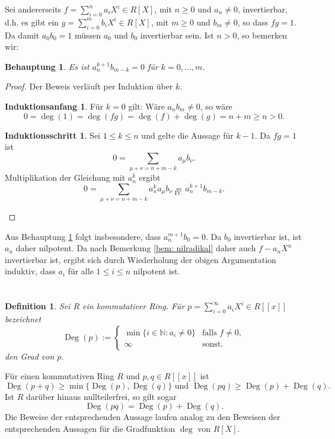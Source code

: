 \documentclass[a4paper,10pt]{article}
\newcounter{satze}
\newtheorem{beh}[satze]{Behauptung}
\newtheorem*{defi}{Definition}
\theoremstyle{definition}
\newtheorem*{ia}{Induktionsanfang}
\newtheorem*{is}{Induktionsschritt}
\newcommand{\N}{\mathbb{N}}
\newcommand{\Deg}{\operatorname{Deg}}
\begin{document}
Sei andererseits $f = \sum_{i=0}^n a_i X^i \in R[X]$, mit $n \geq 0$ und $a_n \neq 0$, invertierbar, d.h. es gibt ein $g = \sum_{i=0}^m b_i X^i \in R[X]$, mit $m \geq 0$ und $b_m \neq 0$, so dass $fg = 1$. Da damit $a_0 b_0 = 1$ müssen $a_0$ und $b_0$ invertierbar sein. Ist $n > 0$, so bemerken wir:

\begin{beh}\label{beh: a_n nilpotent}
 Es ist $a_n^{k+1} b_{m-k} = 0$ für $k=0,\ldots,m$.
\end{beh}
\begin{proof}
 Der Beweis verläuft per Induktion über $k$.
 \begin{ia}Für $k=0$ gilt: Wäre $a_n b_m \neq 0$, so wäre
  \[
   0 = \deg(1) = \deg(fg) = \deg(f)+\deg(g) = n+m \geq n > 0.
  \]
 \end{ia}
 \begin{is}
 Sei $1 \leq k \leq n$ und gelte die Aussage für $k-1$. Da $fg = 1$ ist
 \[
  0 = \sum_{\mu+\nu = n+m-k} a_\mu b_\nu.
 \]
 Multiplikation der Gleichung mit $a_n^k$ ergibt
 \[
  0 = \sum_{\mu+\nu = n+m-k} a_n^k a_\mu b_\nu \underset{\text{IV.}}= a_n^{k+1} b_{m-k}.
 \]
 \end{is}
\end{proof}
Aus Behauptung \ref{beh: a_n nilpotent} folgt insbesondere, dass $a_n^{m+1} b_0 = 0$. Da $b_0$ invertierbar ist, ist $a_n$ daher nilpotent. Da nach Bemerkung \ref{bem: nilradikal} daher auch $f- a_n X^n$ invertierbar ist, ergibt sich durch Wiederholung der obigen Argumentation induktiv, dass $a_i$ für alle $1 \leq i \leq n$ nilpotent ist.










\section{}

\begin{defi}
Sei $R$ ein kommutativer Ring. Für $p = \sum_{i=0}^\infty a_i X^i \in R[\![x]\!]$ bezeichnet
\[
 \Deg(p) :=
 \begin{cases}
  \min \{i \in \N : a_i \neq 0\} & \text{falls } f \neq 0, \\
                          \infty & \text{sonst}.
 \end{cases}
\]
den Grad von $p$.
\end{defi}
Für einen kommutativen Ring $R$ und $p,q \in R[\![x]\!]$ ist
\begin{equation}\label{eq: Deg Ungleichungen}
 \Deg(p+q) \geq \min \{\Deg(p), \Deg(q)\} \text{ und }
 \Deg(pq) \geq \Deg(p) + \Deg(q).
\end{equation}
Ist $R$ darüber hinaus nullteilerfrei, so gilt sogar
\begin{equation}\label{eq: Deg nullteilerfrei}
 \Deg(pq) = \Deg(p) + \Deg(q).
\end{equation}
Die Beweise der entsprechenden Aussage laufen analog zu den Beweisen der entsprechenden Aussagen für die Gradfunktion $\deg$ von $R[X]$.
\end{document}
